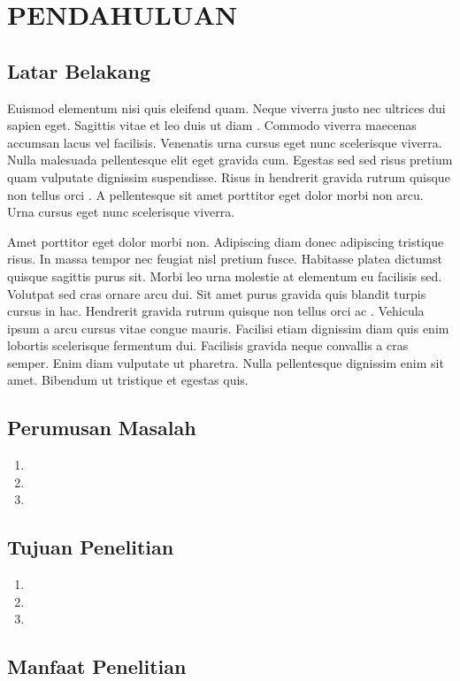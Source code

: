 \chapter{PENDAHULUAN}

\section{Latar Belakang}
Euismod elementum nisi quis eleifend quam. Neque viverra justo nec ultrices dui sapien eget. Sagittis vitae et leo duis ut diam \cite{IEApvps2020,irena2020}. Commodo viverra maecenas accumsan lacus vel facilisis. Venenatis urna cursus eget nunc scelerisque viverra. Nulla malesuada pellentesque elit eget gravida cum. Egestas sed sed risus pretium quam vulputate dignissim suspendisse. Risus in hendrerit gravida rutrum quisque non tellus orci \cite{Wang2004,Gozel2009}. A pellentesque sit amet porttitor eget dolor morbi non arcu. Urna cursus eget nunc scelerisque viverra.

Amet porttitor eget dolor morbi non. Adipiscing diam donec adipiscing tristique risus. In massa tempor nec feugiat nisl pretium fusce. Habitasse platea dictumst quisque sagittis purus sit. Morbi leo urna molestie at elementum eu facilisis sed. Volutpat sed cras ornare arcu dui. Sit amet purus gravida quis blandit turpis cursus in hac. Hendrerit gravida rutrum quisque non tellus orci ac \cite{Reno2016,Andresen2016}. Vehicula ipsum a arcu cursus vitae congue mauris. Facilisi etiam dignissim diam quis enim lobortis scelerisque fermentum dui. Facilisis gravida neque convallis a cras semper. Enim diam vulputate ut pharetra. Nulla pellentesque dignissim enim sit amet. Bibendum ut tristique et egestas quis.

\lipsum[45-47]

\section{Perumusan Masalah}
\lipsum[10]
\begin{enumerate}
    \item \lipsum[19]
    \item \lipsum[20]
    \item \lipsum[21]
\end{enumerate}

\section{Tujuan Penelitian}
\lipsum[23]
\begin{enumerate}
    \item \lipsum[25]
    \item \lipsum[27]
    \item \lipsum[29]
\end{enumerate}

\section{Manfaat Penelitian}
\lipsum[77]
